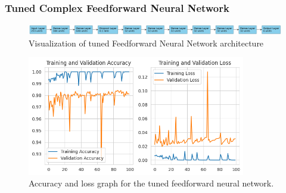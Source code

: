 \subsubsection{Tuned Complex Feedforward Neural Network}

\begin{figure}[ht]
    \centering
    \includegraphics[width=\textwidth]{./img/ffnn/tuned/fnn-best-params}
    \caption{Visualization of tuned Feedforward Neural Network architecture}
    \label{fig:fnn-best-params}
\end{figure}

\begin{figure}[ht]
    \centering
    \includegraphics[width=0.85\textwidth]{./img/ffnn/tuned/accuracy-loss-graph}
    \caption{Accuracy and loss graph for the tuned feedforward neural network.}
    \label{fig:ffnn-tuned-accuracy-loss-graph}
\end{figure}

